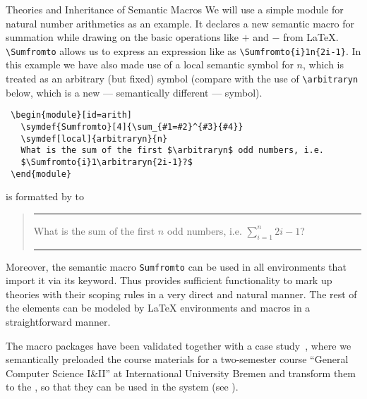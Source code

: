 \begin{tsubsection}{Theories and Inheritance of Semantic Macros}
We will use a simple module for natural number arithmetics as an example. It
declares a new semantic macro for summation while drawing on the basic
operations like $+$ and $-$ from {\LaTeX}.  {\verb|\Sumfromto|} allows us to
express an expression like  as {\verb|\Sumfromto{i}1n{2i-1}|}. In this example we have also made
use of a local semantic symbol for $n$, which is treated as an arbitrary (but
fixed) symbol (compare with the use of {\verb|\arbitraryn|} below, which is a
new --- semantically different --- symbol).
\begin{lstlisting}
 \begin{module}[id=arith]
   \symdef{Sumfromto}[4]{\sum_{#1=#2}^{#3}{#4}}
   \symdef[local]{arbitraryn}{n}
   What is the sum of the first $\arbitraryn$ odd numbers, i.e.
   $\Sumfromto{i}1\arbitraryn{2i-1}?$
 \end{module}
\end{lstlisting}
is formatted by {\sTeX} to
\begin{quote}\hrule
  What is the sum of the first $n$ odd numbers, i.e.  $\sum_{i=1}^n{2i-1}$?\hrule
\end{quote}
Moreover, the semantic macro {\verb|Sumfromto|} can be used in all {}
environments that import it via its {} keyword. Thus {\stex} provides
sufficient functionality to mark up {\omdoc} theories with their scoping rules in a very
direct and natural manner. The rest of the {\omdoc} elements can be modeled by {\LaTeX}
environments and macros in a straightforward manner.

The {\stex} macro packages have been validated together with a case
study~\cite{Kohlhase:smtl05}, where we semantically preloaded the course materials for a
two-semester course ``General Computer Science I\&II'' at International University Bremen
and transform them to the {\omdoc}, so that they can be used in the {\activemath} system
(see {}).
\end{tsubsection}

